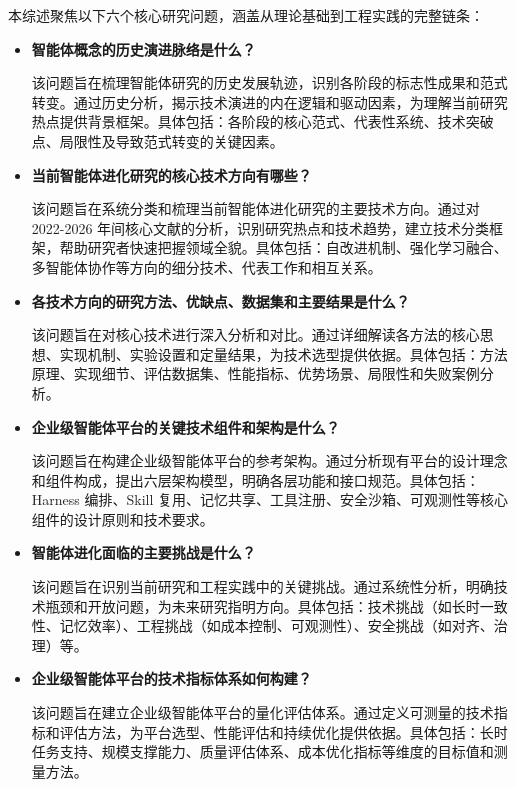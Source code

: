\documentclass[12pt,a4paper]{article}
\begin{document}
本综述聚焦以下六个核心研究问题，涵盖从理论基础到工程实践的完整链条：

\begin{itemize}
    \item[\textbf{RQ1}] \textbf{智能体概念的历史演进脉络是什么？}
    
    该问题旨在梳理智能体研究的历史发展轨迹，识别各阶段的标志性成果和范式转变。通过历史分析，揭示技术演进的内在逻辑和驱动因素，为理解当前研究热点提供背景框架。具体包括：各阶段的核心范式、代表性系统、技术突破点、局限性及导致范式转变的关键因素。
    
    \item[\textbf{RQ2}] \textbf{当前智能体进化研究的核心技术方向有哪些？}
    
    该问题旨在系统分类和梳理当前智能体进化研究的主要技术方向。通过对 2022-2026 年间核心文献的分析，识别研究热点和技术趋势，建立技术分类框架，帮助研究者快速把握领域全貌。具体包括：自改进机制、强化学习融合、多智能体协作等方向的细分技术、代表工作和相互关系。
    
    \item[\textbf{RQ3}] \textbf{各技术方向的研究方法、优缺点、数据集和主要结果是什么？}
    
    该问题旨在对核心技术进行深入分析和对比。通过详细解读各方法的核心思想、实现机制、实验设置和定量结果，为技术选型提供依据。具体包括：方法原理、实现细节、评估数据集、性能指标、优势场景、局限性和失败案例分析。
    
    \item[\textbf{RQ4}] \textbf{企业级智能体平台的关键技术组件和架构是什么？}
    
    该问题旨在构建企业级智能体平台的参考架构。通过分析现有平台的设计理念和组件构成，提出六层架构模型，明确各层功能和接口规范。具体包括：Harness 编排、Skill 复用、记忆共享、工具注册、安全沙箱、可观测性等核心组件的设计原则和技术要求。
    
    \item[\textbf{RQ5}] \textbf{智能体进化面临的主要挑战是什么？}
    
    该问题旨在识别当前研究和工程实践中的关键挑战。通过系统性分析，明确技术瓶颈和开放问题，为未来研究指明方向。具体包括：技术挑战（如长时一致性、记忆效率）、工程挑战（如成本控制、可观测性）、安全挑战（如对齐、治理）等。
    
    \item[\textbf{RQ6}] \textbf{企业级智能体平台的技术指标体系如何构建？}
    
    该问题旨在建立企业级智能体平台的量化评估体系。通过定义可测量的技术指标和评估方法，为平台选型、性能评估和持续优化提供依据。具体包括：长时任务支持、规模支撑能力、质量评估体系、成本优化指标等维度的目标值和测量方法。
\end{itemize}
\end{document}
